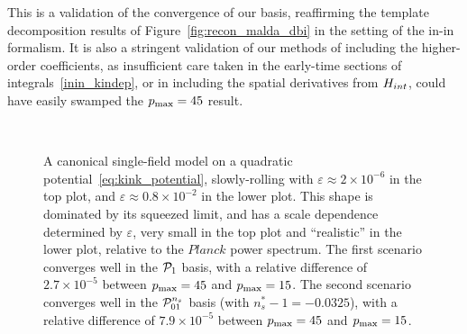 This is a validation of the convergence of our basis,
reaffirming the template decomposition results of Figure~\ref{fig:recon_malda_dbi}
in the setting of the in-in formalism.
It is also a stringent validation of our methods of including the higher-order
coefficients, as insufficient care taken in the early-time sections of
integrals~\eqref{inin_kindep}, or in including the spatial derivatives
from $H_{int}$, could have easily swamped the $p_\text{max}=45$ result.


\begin{figure}[!pth]
\centering
    \\[-2ex]
\caption{
    A canonical single-field model on a quadratic
    potential~\eqref{eq:kink_potential},
    slowly-rolling with $\varepsilon\approx2\times10^{-6}$
    in the top plot, and $\varepsilon\approx0.8\times10^{-2}$
    in the lower plot.
    This shape is dominated by its squeezed limit,
    and has a scale dependence determined by $\varepsilon$,
    very small in the top plot and ``realistic'' in the
    lower plot, relative to the $\textit{Planck}$ power spectrum.
    The first scenario converges well in the $\mathcal{P}_1$ basis,
    with a relative difference of $2.7\times10^{-5}$
    between $p_\text{max}=45$ and $p_\text{max}=15$.
    The second scenario converges well in the $\mathcal{P}^{n_s}_{01}$ basis
    (with $n_s^{*}-1 = -0.0325$),
    with a relative difference of $7.9\times10^{-5}$
    between $p_\text{max}=45$ and $p_\text{max}=15$.
}\label{slice_plot_malda}
\end{figure}


